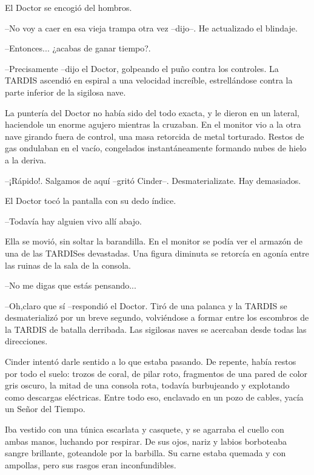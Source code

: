 El Doctor se encogió del hombros. 



--No voy a caer en esa vieja trampa otra vez --dijo--. He actualizado el blindaje.

--Entonces... ¿acabas de ganar tiempo?.

--Precisamente --dijo el Doctor, golpeando el puño contra los controles. La TARDIS ascendió en espiral a una velocidad increíble, estrellándose contra la parte inferior de la sigilosa nave.



La puntería del Doctor no había sido del todo exacta, y le dieron en un lateral, haciendole un enorme agujero mientras la cruzaban. En el monitor vio a la otra nave girando fuera de control, una masa retorcida de metal torturado. Restos de gas ondulaban en el vacío, congelados instantáneamente formando nubes de hielo a la deriva.



--¡Rápido!. Salgamos de aquí --gritó Cinder--. Desmaterializate. Hay demasiados.



El Doctor tocó la pantalla con su dedo índice. 



--Todavía hay alguien vivo allí abajo.



Ella se movió, sin soltar la barandilla. En el monitor se podía ver el armazón de una de las TARDISes devastadas. Una figura diminuta se retorcía en agonía entre las ruinas de la sala de la consola.



--No me digas que estás pensando...

--Oh,claro que sí --respondió el Doctor. Tiró de una palanca y la TARDIS se desmaterializó por un breve segundo, volviéndose a formar entre los escombros de la TARDIS de batalla derribada. Las sigilosas naves se acercaban desde todas las direcciones.



Cinder intentó darle sentido a lo que estaba pasando. De repente, había restos por todo el suelo: trozos de coral, de pilar roto, fragmentos de una pared de color gris oscuro, la mitad de una consola rota, todavía burbujeando y explotando como descargas eléctricas. Entre todo eso, enclavado en un pozo de cables, yacía un Señor del Tiempo.

Iba vestido con una túnica escarlata y casquete, y se agarraba el cuello con ambas manos, luchando por respirar. De sus ojos, nariz y labios borboteaba sangre brillante, goteandole por la barbilla. Su carne estaba quemada y con ampollas, pero sus rasgos eran inconfundibles. 



